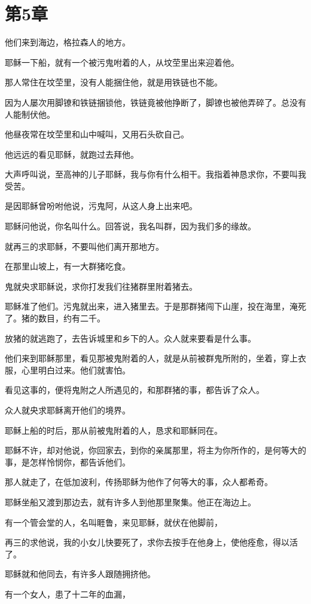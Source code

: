 \documentclass[12pt,oneside]{book}
\begin{document}
\chapter{第5章}
他们来到海边，格拉森人的地方。

耶稣一下船，就有一个被污鬼咐着的人，从坟茔里出来迎着他。

那人常住在坟茔里，没有人能捆住他，就是用铁链也不能。

因为人屡次用脚镣和铁链捆锁他，铁链竟被他挣断了，脚镣也被他弄碎了。总没有人能制伏他。

他昼夜常在坟茔里和山中喊叫，又用石头砍自己。

他远远的看见耶稣，就跑过去拜他。

大声呼叫说，至高神的儿子耶稣，我与你有什么相干。我指着神恳求你，不要叫我受苦。

是因耶稣曾吩咐他说，污鬼阿，从这人身上出来吧。

耶稣问他说，你名叫什么。回答说，我名叫群，因为我们多的缘故。

就再三的求耶稣，不要叫他们离开那地方。

在那里山坡上，有一大群猪吃食。

鬼就央求耶稣说，求你打发我们往猪群里附着猪去。

耶稣准了他们。污鬼就出来，进入猪里去。于是那群猪闯下山崖，投在海里，淹死了。猪的数目，约有二千。

放猪的就逃跑了，去告诉城里和乡下的人。众人就来要看是什么事。

他们来到耶稣那里，看见那被鬼附着的人，就是从前被群鬼所附的，坐着，穿上衣服，心里明白过来。他们就害怕。

看见这事的，便将鬼附之人所遇见的，和那群猪的事，都告诉了众人。

众人就央求耶稣离开他们的境界。

耶稣上船的时后，那从前被鬼附着的人，恳求和耶稣同在。

耶稣不许，却对他说，你回家去，到你的亲属那里，将主为你所作的，是何等大的事，是怎样怜悯你，都告诉他们。

那人就走了，在低加波利，传扬耶稣为他作了何等大的事，众人都希奇。

耶稣坐船又渡到那边去，就有许多人到他那里聚集。他正在海边上。

有一个管会堂的人，名叫睚鲁，来见耶稣，就伏在他脚前，

再三的求他说，我的小女儿快要死了，求你去按手在他身上，使他痊愈，得以活了。

耶稣就和他同去，有许多人跟随拥挤他。

有一个女人，患了十二年的血漏，
\end{document}
